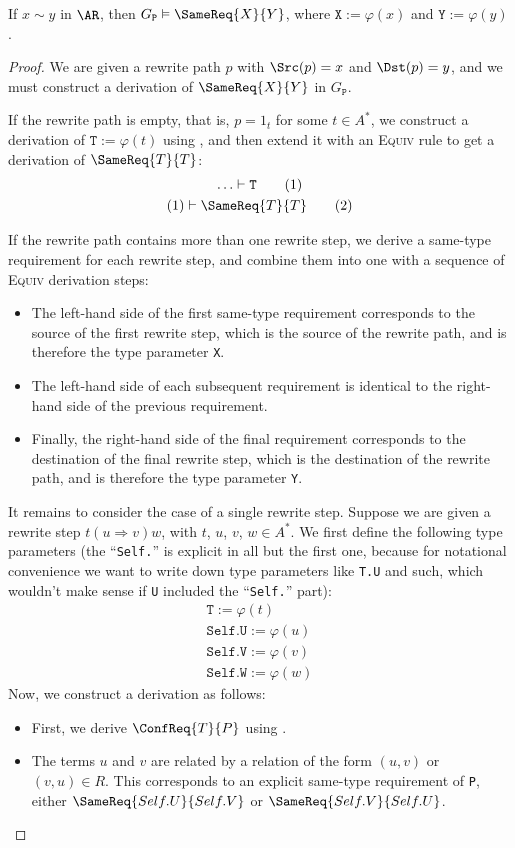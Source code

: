 \documentclass[../generics]{subfiles}
\begin{document}
\begin{theorem}\label{path to derivation}
If $x\sim y$ in $\AR$, then $G_\texttt{P}\vDash\SameReq{X}{Y}$, where $\texttt{X}:=\varphi(x)$ and $\texttt{Y}:=\varphi(y)$.
\end{theorem}
\begin{proof}
We are given a rewrite path $p$ with $\Src(p)=x$ and $\Dst(p)=y$, and we must construct a derivation of $\SameReq{X}{Y}$ in $G_\texttt{P}$.

If the rewrite path is empty, that is, $p=1_t$ for some $t\in A^*$, we construct a derivation of $\texttt{T}:=\varphi(t)$ using , and then extend it with an \textsc{Equiv} rule to get a derivation of $\SameReq{T}{T}$:
\begin{gather*}
\ldots\vdash\texttt{T}\tag{1}\\
(1)\vdash\SameReq{T}{T}\tag{2}
\end{gather*}

If the rewrite path contains more than one rewrite step, we derive a same-type requirement for each rewrite step, and combine them into one with a sequence of \textsc{Equiv} derivation steps:
\begin{itemize}
\item The left-hand side of the first same-type requirement corresponds to the source of the first rewrite step, which is the source of the rewrite path, and is therefore the type parameter \texttt{X}.
\item The left-hand side of each subsequent requirement is identical to the right-hand side of the previous requirement.
\item Finally, the right-hand side of the final requirement corresponds to the destination of the final rewrite step, which is the destination of the rewrite path, and is therefore the type parameter \texttt{Y}.
\end{itemize}

It remains to consider the case of a single rewrite step. Suppose we are given a rewrite step $t(u\Rightarrow v)w$, with $t$, $u$, $v$, $w\in A^*$. We first define the following type parameters (the ``\texttt{Self.}'' is explicit in all but the first one, because for notational convenience we want to write down type parameters like \texttt{T.U} and such, which wouldn't make sense if \texttt{U} included the ``\texttt{Self.}'' part):
\begin{gather*}
\texttt{T} := \varphi(t)\\
\texttt{Self.U} := \varphi(u)\\
\texttt{Self.V} := \varphi(v)\\
\texttt{Self.W} := \varphi(w)
\end{gather*}
Now, we construct a derivation as follows:
\begin{itemize}
\item First, we derive $\ConfReq{T}{P}$ using .
\item The terms $u$ and $v$ are related by a relation of the form $(u,v)$ or $(v,u)\in R$. This corresponds to an explicit same-type requirement of \texttt{P}, either $\SameReq{Self.U}{Self.V}$ or $\SameReq{Self.V}{Self.U}$.


\end{itemize}
\end{proof}
\end{document}
